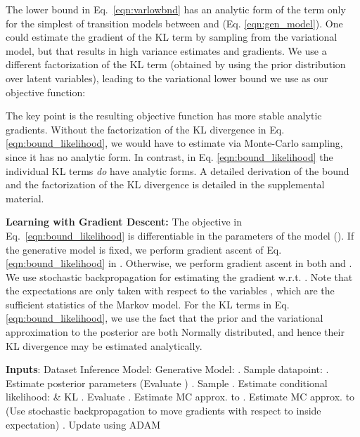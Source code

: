 \documentclass[letterpaper]{article}
\theoremstyle{plain}
\newcommand{\citep}{\cite}
\newcommand{\DMM}{DMM\xspace}
\begin{document}
The lower bound in Eq.~\ref{eqn:varlowbnd} has an analytic form of the  term only for the simplest of transition models  between  and  (Eq. \ref{eqn:gen_model}). 
One could estimate the gradient of the KL term by sampling from the variational model, 
but that results in high variance estimates and gradients. We use a different factorization of the KL term (obtained by using the prior distribution over latent variables), leading to the variational lower bound we use as our objective function:


The key point is the resulting objective function has more stable analytic gradients.
Without the factorization of the KL divergence in Eq. \ref{eqn:bound_likelihood}, 
we would have to estimate  via
Monte-Carlo sampling, since it has no analytic form. In contrast, in Eq. \ref{eqn:bound_likelihood} 
the individual KL terms \emph{do} have analytic forms.
A detailed derivation of the bound and the factorization of the KL divergence is detailed in the supplemental material.

\textbf{Learning with Gradient Descent:} 
The objective in Eq.~\ref{eqn:bound_likelihood} is differentiable
in the parameters of the model ().
If the generative model  is fixed, we perform gradient ascent of Eq. \ref{eqn:bound_likelihood}
in . Otherwise, we perform gradient ascent in both  and .
We use stochastic backpropagation \cite{kingma2013auto,rezende2014stochastic} 
for estimating the gradient w.r.t. . 
Note that the expectations are only taken with respect to the variables , which are the sufficient statistics of the Markov model. 
For the KL terms in Eq. \ref{eqn:bound_likelihood}, we use the fact that the prior  and the
variational approximation to the posterior
 are both Normally distributed, and
hence their KL divergence may be estimated analytically.

\begin{algorithm}[h]
\caption{\small \textbf{Learning a \DMM with stochastic gradient descent: } 
	We use a single sample from the recognition network during learning to evaluate expectations in the bound. 
We aggregate gradients across mini-batches.}
\begin{algorithmic} \label{alg1}
	\STATE \textbf{Inputs}: Dataset 
\STATE \qquad\quad\; Inference Model: 
\STATE \qquad\quad\; Generative Model: 
\WHILE{}
. Sample datapoint: 
. Estimate posterior parameters (Evaluate )
. Sample 
. Estimate conditional likelihood:  \& KL
. Evaluate  
. Estimate MC approx. to  
. Estimate MC approx. to  
\STATE (Use stochastic backpropagation to move gradients with respect to  inside expectation)
. Update  using ADAM \citep{kingma2014adam} 
\ENDWHILE 
\end{algorithmic}
\end{algorithm}
\end{document}
